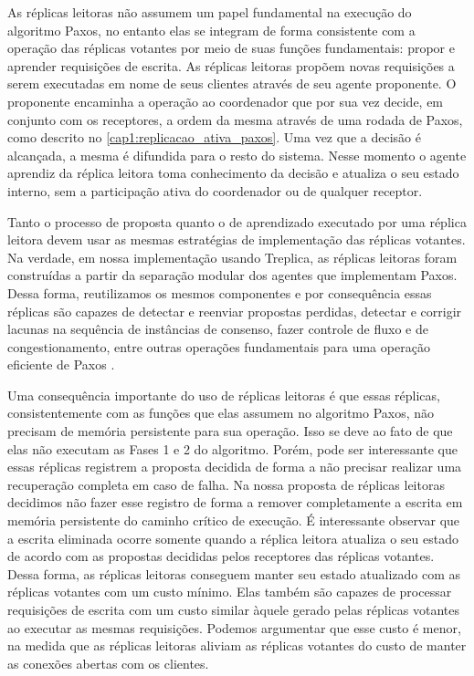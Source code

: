 As réplicas leitoras não assumem um papel fundamental na execução do algoritmo Paxos, no
entanto elas se integram de forma consistente com a operação das réplicas votantes por
meio de suas funções fundamentais: propor e aprender requisições de escrita. As réplicas
leitoras propõem novas requisições a serem executadas em nome de seus clientes através de
seu agente proponente. O proponente encaminha a operação ao coordenador que por sua vez
decide, em conjunto com os receptores, a ordem da mesma através de uma rodada de Paxos,
como descrito no \autoref{cap1:replicacao_ativa_paxos}. Uma vez que a decisão é alcançada,
a mesma é difundida para o resto do sistema. Nesse momento o agente aprendiz da réplica
leitora toma conhecimento da decisão e atualiza o seu estado interno, sem a participação
ativa do coordenador ou de qualquer receptor.

Tanto o processo de proposta quanto o de aprendizado executado por uma réplica leitora
devem usar as mesmas estratégias de implementação das réplicas votantes. Na verdade, em
nossa implementação usando Treplica, as réplicas leitoras foram construídas a partir da
separação modular dos agentes que implementam Paxos. Dessa forma, reutilizamos os mesmos
componentes e por consequência essas réplicas são capazes de detectar e reenviar propostas
perdidas, detectar e corrigir lacunas na sequência de instâncias de consenso, fazer
controle de fluxo e de congestionamento, entre outras operações fundamentais para uma
operação eficiente de Paxos \cite{vieira-tr10b}.

Uma consequência importante do uso de réplicas leitoras é que essas réplicas,
consistentemente com as funções que elas assumem no algoritmo Paxos, não precisam de
memória persistente para sua operação. Isso se deve ao fato de que elas não executam as
Fases 1 e 2 do algoritmo. Porém, pode ser interessante que essas réplicas registrem a
proposta decidida de forma a não precisar realizar uma recuperação completa em caso de
falha. Na nossa proposta de réplicas leitoras decidimos não fazer esse registro de forma a
remover completamente a escrita em memória persistente do caminho crítico de execução. É
interessante observar que a escrita eliminada ocorre somente quando a réplica leitora
atualiza o seu estado de acordo com as propostas decididas pelos receptores das réplicas
votantes. Dessa forma, as réplicas leitoras conseguem manter seu estado atualizado com as
réplicas votantes com um custo mínimo. Elas também são capazes de processar requisições de
escrita com um custo similar àquele gerado pelas réplicas votantes ao executar as mesmas
requisições. Podemos argumentar que esse custo é menor, na medida que as réplicas leitoras
aliviam as réplicas votantes do custo de manter as conexões abertas com os clientes.


